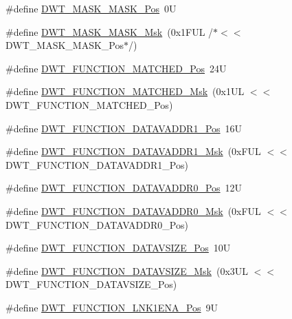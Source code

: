 \begin{DoxyCompactItemize}
\#define \hyperlink{group___c_m_s_i_s___d_w_t_gaf798ae34e2b9280ea64f4d9920cd2e7d}{D\+W\+T\+\_\+\+M\+A\+S\+K\+\_\+\+M\+A\+S\+K\+\_\+\+Pos}~0U
\item 
\#define \hyperlink{group___c_m_s_i_s___d_w_t_gadd798deb0f1312feab4fb05dcddc229b}{D\+W\+T\+\_\+\+M\+A\+S\+K\+\_\+\+M\+A\+S\+K\+\_\+\+Msk}~(0x1\+F\+U\+L /$\ast$$<$$<$ D\+W\+T\+\_\+\+M\+A\+S\+K\+\_\+\+M\+A\+S\+K\+\_\+\+Pos$\ast$/)
\item 
\#define \hyperlink{group___c_m_s_i_s___d_w_t_ga22c5787493f74a6bacf6ffb103a190ba}{D\+W\+T\+\_\+\+F\+U\+N\+C\+T\+I\+O\+N\+\_\+\+M\+A\+T\+C\+H\+E\+D\+\_\+\+Pos}~24U
\item 
\#define \hyperlink{group___c_m_s_i_s___d_w_t_gac8b1a655947490280709037808eec8ac}{D\+W\+T\+\_\+\+F\+U\+N\+C\+T\+I\+O\+N\+\_\+\+M\+A\+T\+C\+H\+E\+D\+\_\+\+Msk}~(0x1\+U\+L $<$$<$ D\+W\+T\+\_\+\+F\+U\+N\+C\+T\+I\+O\+N\+\_\+\+M\+A\+T\+C\+H\+E\+D\+\_\+\+Pos)
\item 
\#define \hyperlink{group___c_m_s_i_s___d_w_t_ga8b75e8ab3ffd5ea2fa762d028dc30e8c}{D\+W\+T\+\_\+\+F\+U\+N\+C\+T\+I\+O\+N\+\_\+\+D\+A\+T\+A\+V\+A\+D\+D\+R1\+\_\+\+Pos}~16U
\item 
\#define \hyperlink{group___c_m_s_i_s___d_w_t_gafdbf5a8c367befe8661a4f6945c83445}{D\+W\+T\+\_\+\+F\+U\+N\+C\+T\+I\+O\+N\+\_\+\+D\+A\+T\+A\+V\+A\+D\+D\+R1\+\_\+\+Msk}~(0x\+F\+U\+L $<$$<$ D\+W\+T\+\_\+\+F\+U\+N\+C\+T\+I\+O\+N\+\_\+\+D\+A\+T\+A\+V\+A\+D\+D\+R1\+\_\+\+Pos)
\item 
\#define \hyperlink{group___c_m_s_i_s___d_w_t_ga9854cd8bf16f7dce0fb196a8029b018e}{D\+W\+T\+\_\+\+F\+U\+N\+C\+T\+I\+O\+N\+\_\+\+D\+A\+T\+A\+V\+A\+D\+D\+R0\+\_\+\+Pos}~12U
\item 
\#define \hyperlink{group___c_m_s_i_s___d_w_t_gafc5efbe8f9b51e04aecd00c8a4eb50fb}{D\+W\+T\+\_\+\+F\+U\+N\+C\+T\+I\+O\+N\+\_\+\+D\+A\+T\+A\+V\+A\+D\+D\+R0\+\_\+\+Msk}~(0x\+F\+U\+L $<$$<$ D\+W\+T\+\_\+\+F\+U\+N\+C\+T\+I\+O\+N\+\_\+\+D\+A\+T\+A\+V\+A\+D\+D\+R0\+\_\+\+Pos)
\item 
\#define \hyperlink{group___c_m_s_i_s___d_w_t_ga0517a186d4d448aa6416440f40fe7a4d}{D\+W\+T\+\_\+\+F\+U\+N\+C\+T\+I\+O\+N\+\_\+\+D\+A\+T\+A\+V\+S\+I\+Z\+E\+\_\+\+Pos}~10U
\item 
\#define \hyperlink{group___c_m_s_i_s___d_w_t_gaab42cbc1e6084c44d5de70971613ea76}{D\+W\+T\+\_\+\+F\+U\+N\+C\+T\+I\+O\+N\+\_\+\+D\+A\+T\+A\+V\+S\+I\+Z\+E\+\_\+\+Msk}~(0x3\+U\+L $<$$<$ D\+W\+T\+\_\+\+F\+U\+N\+C\+T\+I\+O\+N\+\_\+\+D\+A\+T\+A\+V\+S\+I\+Z\+E\+\_\+\+Pos)
\item 
\#define \hyperlink{group___c_m_s_i_s___d_w_t_ga89d7c48858b4d4de96cdadfac91856a1}{D\+W\+T\+\_\+\+F\+U\+N\+C\+T\+I\+O\+N\+\_\+\+L\+N\+K1\+E\+N\+A\+\_\+\+Pos}~9U

\end{DoxyCompactItemize}
